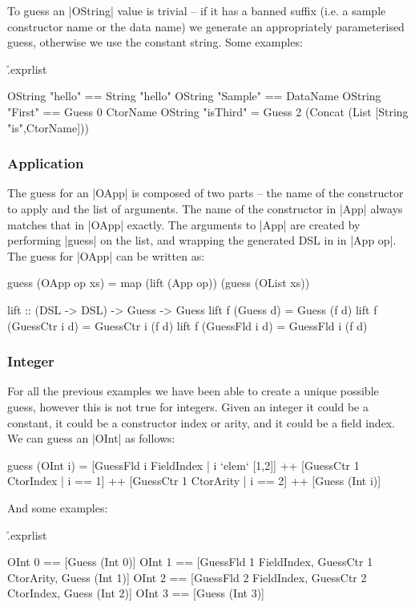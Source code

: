 \documentclass[preprint,draft]{sigplanconf}
\begin{document}
To guess an |OString| value is trivial -- if it has a banned suffix (i.e. a sample constructor name or the data name) we generate an appropriately parameterised guess, otherwise we use the constant string. Some examples:

\h{.exprlist}\begin{code}
OString "hello" == String "hello"
OString "Sample" == DataName
OString "First" == Guess 0 CtorName
OString "isThird" = Guess 2 (Concat (List [String "is",CtorName]))
\end{code}

\subsubsection{Application}

The guess for an |OApp| is composed of two parts -- the name of the constructor to apply and the list of arguments. The name of the constructor in |App| always matches that in |OApp| exactly. The arguments to |App| are created by performing |guess| on the list, and wrapping the generated DSL in in |App op|. The guess for |OApp| can be written as:

\begin{code}
guess (OApp op xs) = map (lift (App op)) (guess (OList xs))

lift :: (DSL -> DSL) -> Guess -> Guess
lift f (Guess       d) = Guess       (f d)
lift f (GuessCtr i  d) = GuessCtr i  (f d)
lift f (GuessFld i  d) = GuessFld i  (f d)
\end{code}

\subsubsection{Integer}

For all the previous examples we have been able to create a unique possible guess, however this is not true for integers. Given an integer it could be a constant, it could be a constructor index or arity, and it could be a field index. We can guess an |OInt| as follows:

\begin{code}
guess (OInt i) =
    [GuessFld i FieldIndex | i `elem` [1,2]] ++
    [GuessCtr 1 CtorIndex | i == 1] ++
    [GuessCtr 1 CtorArity | i == 2] ++
    [Guess (Int i)]
\end{code}

\noindent And some examples:

\h{.exprlist}\begin{code}
OInt 0 == [Guess (Int 0)]
OInt 1 == [GuessFld 1 FieldIndex, GuessCtr 1 CtorArity, Guess (Int 1)]
OInt 2 == [GuessFld 2 FieldIndex, GuessCtr 2 CtorIndex, Guess (Int 2)]
OInt 3 == [Guess (Int 3)]
\end{code}
\end{document}
